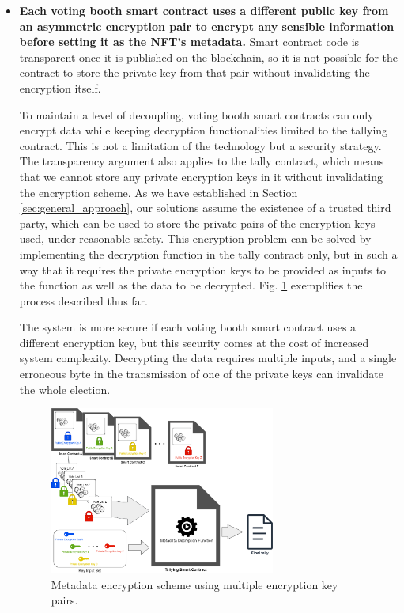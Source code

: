 \documentclass[../main.tex]{subfiles}
\begin{document}
\begin{itemize}
    \item{\textbf{Each voting booth smart contract uses a different public key from an asymmetric encryption pair to encrypt any sensible information before setting it as the NFT's metadata.} Smart contract code is transparent once it is published on the blockchain, so it is not possible for the contract to store the private key from that pair without invalidating the encryption itself.
          \par
          To maintain a level of decoupling, voting booth smart contracts can only encrypt data while keeping decryption functionalities limited to the tallying contract. This is not a limitation of the technology but a security strategy. The transparency argument also applies to the tally contract, which means that we cannot store any private encryption keys in it without invalidating the encryption scheme. As we have established in Section \ref{sec:general_approach}, our solutions assume the existence of a trusted third party, which can be used to store the private pairs of the encryption keys used, under reasonable safety. This encryption problem can be solved by implementing the decryption function in the tally contract only, but in such a way that it requires the private encryption keys to be provided as inputs to the function as well as the data to be decrypted. Fig. \ref{fig:multiple_encryption_key_scheme} exemplifies the process described thus far.
          \par
          The system is more secure if each voting booth smart contract uses a different encryption key, but this security comes at the cost of increased system complexity. Decrypting the data requires multiple inputs, and a single erroneous byte in the transmission of one of the private keys can invalidate the whole election.}

          \begin{figure}[htp]
              \centering
              \includegraphics[width=0.7\textwidth]{../Images/ContractBasedSolution_encryption_mult_keys.png}
              \caption{Metadata encryption scheme using multiple encryption key pairs.}
              \label{fig:multiple_encryption_key_scheme}
          \end{figure}


\end{itemize}
\end{document}
